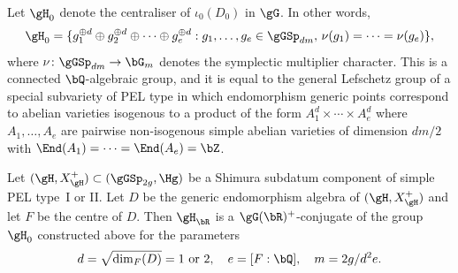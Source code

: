 Let $\gH_0$ denote the centraliser of $\iota_0(D_0)$ in $\gG$.
In other words,
\begin{equation} \label{eqn:H0}
\gH_0 = \{ g_1^{\oplus d} \oplus g_2^{\oplus d} \oplus \dotsb \oplus g_e^{\oplus d} :
g_1, \dotsc, g_e \in \gGSp_{dm},
\, \nu(g_1) = \dotsb = \nu(g_e) \},
\end{equation}
where $\nu \colon \gGSp_{dm} \to \bG_m$ denotes the symplectic multiplier character.
This is a connected $\bQ$-algebraic group, and it is equal to the general Lefschetz group of a special subvariety of PEL type in which endomorphism generic points correspond to abelian varieties isogenous to a product of the form $A_1^d \times \dotsb \times A_e^d$ where $A_1, \dotsc, A_e$ are pairwise non-isogenous simple abelian varieties of dimension $dm/2$ with $\End(A_1) = \dotsb = \End(A_e) = \bZ$.

\begin{lemma} \label{conj-class-mt}
Let $(\gH, X_\gH^+) \subset (\gGSp_{2g}, \Hg)$ be a Shimura subdatum component of simple PEL type~I or II.
Let $D$ be the generic endomorphism algebra of $(\gH, X_\gH^+)$ and let $F$ be the centre of $D$.
Then $\gH_\bR$ is a $\gG(\bR)^+$-conjugate of the group $\gH_0$ constructed above for the parameters
\[
d = \sqrt{\dim_F(D)} = 1 \text{ or } 2, \quad e = [F:\bQ], \quad m = 2g/d^2e.
\]
\end{lemma}

